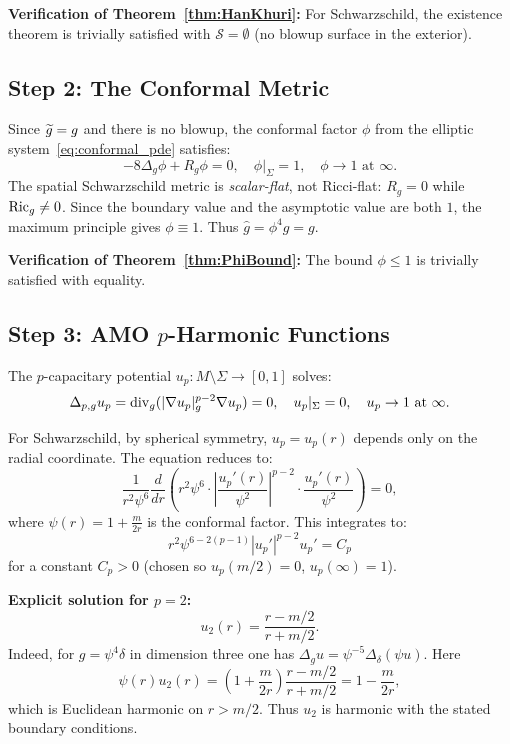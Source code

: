 \textbf{Verification of Theorem~\ref{thm:HanKhuri}:} For Schwarzschild, the existence theorem is trivially satisfied with $\mathcal{S} = \emptyset$ (no blowup surface in the exterior).

\subsection{Step 2: The Conformal Metric}
Since $\widetilde{g} = g$ and there is no blowup, the conformal factor $\phi$ from the elliptic system~\eqref{eq:conformal_pde} satisfies:
\begin{equation}
    -8\Delta_g \phi + R_g \phi = 0, \quad \phi|_\Sigma = 1, \quad \phi \to 1 \text{ at } \infty.
\end{equation}
The spatial Schwarzschild metric is \emph{scalar-flat}, not Ricci-flat: $R_g = 0$ while $\mathrm{Ric}_g \neq 0$. Since the boundary value and the asymptotic value are both $1$, the maximum principle gives $\phi \equiv 1$. Thus $\hat{g} = \phi^4 g = g$.

\textbf{Verification of Theorem~\ref{thm:PhiBound}:} The bound $\phi \le 1$ is trivially satisfied with equality.

\subsection{Step 3: AMO \texorpdfstring{$p$}{p}-Harmonic Functions}
The $p$-capacitary potential $u_p: M \setminus \Sigma \to [0,1]$ solves:
\begin{equation}
    \Delta_{p,g} u_p = \mathrm{div}_g(|\nabla u_p|_g^{p-2} \nabla u_p) = 0, \quad u_p|_\Sigma = 0, \quad u_p \to 1 \text{ at } \infty.
\end{equation}

For Schwarzschild, by spherical symmetry, $u_p = u_p(r)$ depends only on the radial coordinate. The equation reduces to:
\begin{equation}
    \frac{1}{r^2 \psi^6} \frac{d}{dr}\left( r^2 \psi^6 \cdot \left|\frac{u_p'(r)}{\psi^2}\right|^{p-2} \cdot \frac{u_p'(r)}{\psi^2} \right) = 0,
\end{equation}
where $\psi(r) = 1 + \frac{m}{2r}$ is the conformal factor. This integrates to:
\begin{equation}
    r^2 \psi^{6-2(p-1)} |u_p'|^{p-2} u_p' = C_p
\end{equation}
for a constant $C_p > 0$ (chosen so $u_p(m/2) = 0$, $u_p(\infty) = 1$).

\textbf{Explicit solution for $p = 2$:}
\begin{equation}
    u_2(r) = \frac{r - m/2}{r + m/2}.
\end{equation}
Indeed, for $g = \psi^4 \delta$ in dimension three one has $\Delta_g u = \psi^{-5}\Delta_\delta(\psi u)$. Here
\begin{equation}
    \psi(r)u_2(r) = \left(1+\frac{m}{2r}\right)\frac{r-m/2}{r+m/2} = 1-\frac{m}{2r},
\end{equation}
which is Euclidean harmonic on $r > m/2$. Thus $u_2$ is harmonic with the stated boundary conditions.

